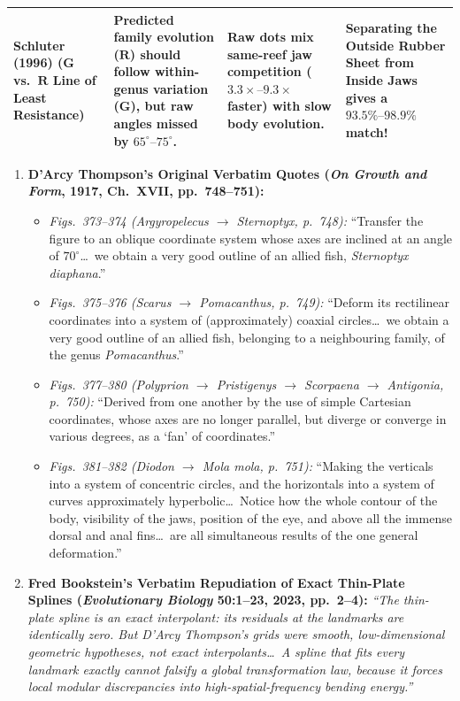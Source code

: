 \documentclass[12pt,a4paper]{article}
\begin{document}
\begin{table}[H]
{\begin{tabular}{@{}p{}p{}p{}p{}@{}}
\rowcolor{cardbg}
\textbf{Schluter (1996)} ($\mathbf{G}$ vs.\ $\mathbf{R}$ Line of Least Resistance) & Predicted family evolution ($\mathbf{R}$) should follow within-genus variation ($\mathbf{G}$), but raw angles missed by $65^\circ\text{--}75^\circ$. & Raw dots mix \textbf{same-reef jaw competition ($3.3\times\text{--}9.3\times$ faster)} with slow body evolution. & Separating the Outside Rubber Sheet from Inside Jaws gives a $\mathbf{93.5\%\text{--}98.9\%}$ match! \\
\bottomrule
\end{tabular}%
}
\end{table}

\begin{enumerate}
  \item \textbf{D'Arcy Thompson's Original Verbatim Quotes (\emph{On Growth and Form}, 1917, Ch.\ XVII, pp.\ 748--751):}
  \begin{itemize}
    \item \emph{Figs.\ 373--374 (\emph{Argyropelecus} $\to$ \emph{Sternoptyx}, p.\ 748):} ``Transfer the figure to an oblique coordinate system whose axes are inclined at an angle of $70^\circ$\dots\ we obtain a very good outline of an allied fish, \emph{Sternoptyx diaphana}.''
    \item \emph{Figs.\ 375--376 (\emph{Scarus} $\to$ \emph{Pomacanthus}, p.\ 749):} ``Deform its rectilinear coordinates into a system of (approximately) coaxial circles\dots\ we obtain a very good outline of an allied fish, belonging to a neighbouring family, of the genus \emph{Pomacanthus}.''
    \item \emph{Figs.\ 377--380 (\emph{Polyprion} $\to$ \emph{Pristigenys} $\to$ \emph{Scorpaena} $\to$ \emph{Antigonia}, p.\ 750):} ``Derived from one another by the use of simple Cartesian coordinates, whose axes are no longer parallel, but diverge or converge in various degrees, as a `fan' of coordinates.''
    \item \emph{Figs.\ 381--382 (\emph{Diodon} $\to$ \emph{Mola mola}, p.\ 751):} ``Making the verticals into a system of concentric circles, and the horizontals into a system of curves approximately hyperbolic\dots\ Notice how the whole contour of the body, visibility of the jaws, position of the eye, and above all the immense dorsal and anal fins\dots\ are all simultaneous results of the one general deformation.''
  \end{itemize}
  \item \textbf{Fred Bookstein's Verbatim Repudiation of Exact Thin-Plate Splines (\emph{Evolutionary Biology} 50:1--23, 2023, pp.\ 2--4):}
  \emph{``The thin-plate spline is an exact interpolant: its residuals at the landmarks are identically zero. But D'Arcy Thompson's grids were smooth, low-dimensional geometric hypotheses, not exact interpolants\dots\ A spline that fits every landmark exactly cannot falsify a global transformation law, because it forces local modular discrepancies into high-spatial-frequency bending energy.''}
\end{enumerate}
\end{document}
